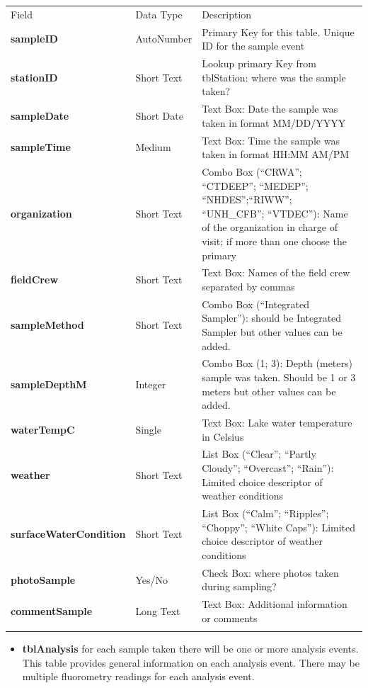 \documentclass[]{article}
\begin{document}
\begin{longtable}[c]{@{}lll@{}}
\toprule\addlinespace
Field & Data Type & Description
\\\addlinespace
\midrule\endhead
\textbf{sampleID} & AutoNumber & Primary Key for this table. Unique ID
for the sample event
\\\addlinespace
\textbf{stationID} & Short Text & Lookup primary Key from tblStation:
where was the sample taken?
\\\addlinespace
\textbf{sampleDate} & Short Date & Text Box: Date the sample was taken
in format MM/DD/YYYY
\\\addlinespace
\textbf{sampleTime} & Medium & Text Box: Time the sample was taken in
format HH:MM AM/PM
\\\addlinespace
\textbf{organization} & Short Text & Combo Box (``CRWA''; ``CTDEEP'';
``MEDEP''; ``NHDES'';``RIWW''; ``UNH\_CFB''; ``VTDEC''): Name of the
organization in charge of visit; if more than one choose the primary
\\\addlinespace
\textbf{fieldCrew} & Short Text & Text Box: Names of the field crew
separated by commas
\\\addlinespace
\textbf{sampleMethod} & Short Text & Combo Box (``Integrated Sampler''):
should be Integrated Sampler but other values can be added.
\\\addlinespace
\textbf{sampleDepthM} & Integer & Combo Box (1; 3): Depth (meters)
sample was taken. Should be 1 or 3 meters but other values can be added.
\\\addlinespace
\textbf{waterTempC} & Single & Text Box: Lake water temperature in
Celsius
\\\addlinespace
\textbf{weather} & Short Text & List Box (``Clear''; ``Partly Cloudy'';
``Overcast''; ``Rain''): Limited choice descriptor of weather conditions
\\\addlinespace
\textbf{surfaceWaterCondition} & Short Text & List Box (``Calm'';
``Ripples''; ``Choppy''; ``White Caps''): Limited choice descriptor of
weather conditions
\\\addlinespace
\textbf{photoSample} & Yes/No & Check Box: where photos taken during
sampling?
\\\addlinespace
\textbf{commentSample} & Long Text & Text Box: Additional information or
comments
\\\addlinespace
\bottomrule
\end{longtable}

\begin{itemize}
\itemsep1pt\parskip0pt
\item
  \textbf{tblAnalysis} for each sample taken there will be one or more
  analysis events. This table provides general information on each
  analysis event. There may be multiple fluorometry readings for each
  analysis event.
\end{itemize}
\end{document}
